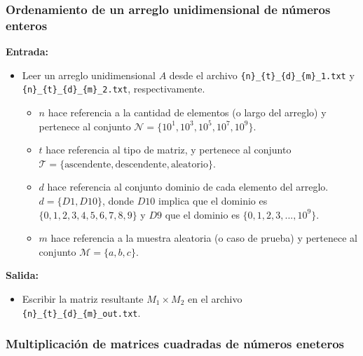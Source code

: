 \subsubsection{Ordenamiento de un arreglo unidimensional de números enteros}

\textbf{Entrada:}
\begin{itemize}
    \item Leer un arreglo unidimensional $A$ desde el archivo \texttt{\{n\}\_\{t\}\_\{d\}\_\{m\}\_1.txt} y \texttt{\{n\}\_\{t\}\_\{d\}\_\{m\}\_2.txt}, respectivamente.
    \begin{itemize}
        \item $n$ hace referencia a la cantidad de elementos (o largo del arreglo) y pertenece al conjunto $\mathcal{N} = \{10^1, 10^3, 10^5, 10^{7}, 10^{9}\}$.
        \item $t$ hace referencia al tipo de matriz, y pertenece al conjunto $\mathcal{T} = \{ \text{ascendente}, \text{descendente}, \text{aleatorio} \}$.
        \item $d$ hace referencia al conjunto dominio de cada elemento del arreglo. $d = \{D1, D10\}$, donde $D10$ implica que el dominio es $\{0,1,2,3,4,5,6,7,8,9\}$ y $D9 $ que el dominio es $ \{0,1,2,3,...,10^9\}$.
        \item $m$ hace referencia a la muestra aleatoria (o caso de prueba) y pertenece al conjunto $\mathcal{M} = \{a,b,c\}$.
    \end{itemize}
\end{itemize}

\textbf{Salida:}
\begin{itemize}
    \item Escribir la matriz resultante $M_1 \times M_2$ en el archivo \texttt{\{n\}\_\{t\}\_\{d\}\_\{m\}\_out.txt}.
\end{itemize}

\subsubsection{Multiplicación de matrices cuadradas de números eneteros}

